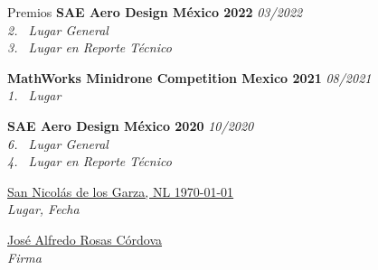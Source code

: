 \documentclass[letterpaper]{resume} %
\begin{document}
    \begin{rSection}{Premios}
        {\bf SAE Aero Design México 2022} \hfill {\itshape 03/2022}
        \\{\textit{2. \textordmasculine~Lugar General}}
        \\{\textit{3. \textordmasculine~Lugar en Reporte Técnico}}
    
        {\bf MathWorks Minidrone Competition Mexico 2021} \hfill {\itshape 08/2021}
        \\{\textit{1. \textordmasculine~Lugar}}
        
        {\bf SAE Aero Design México 2020} \hfill {\itshape 10/2020}
        \\{\textit{6. \textordmasculine~Lugar General}}
        \\{\textit{4. \textordmasculine~Lugar en Reporte Técnico}}
    \end{rSection}

    \begin{rSection}{}
        \vspace{7.5em}
        \begin{minipage}{0.5\linewidth}
            \uline{San Nicolás de los Garza, NL \today}\\
            \textit{Lugar, Fecha}
        \end{minipage}
        \begin{minipage}{0.5\linewidth}
            \uline{José Alfredo Rosas Córdova\hspace{5em}}\\
            \textit{Firma}
        \end{minipage}
    \end{rSection}
\end{document}
